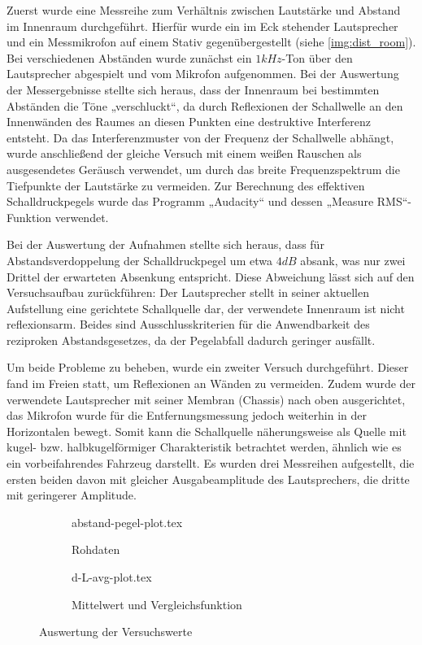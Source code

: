 Zuerst wurde eine Messreihe zum Verhältnis zwischen Lautstärke und Abstand im Innenraum durchgeführt. Hierfür wurde ein im Eck stehender Lautsprecher und ein Messmikrofon auf einem Stativ gegenübergestellt (siehe \autoref{img:dist_room}). Bei verschiedenen Abständen wurde zunächst ein \(1 kHz\)-Ton über den Lautsprecher abgespielt und vom Mikrofon aufgenommen. Bei der Auswertung der Messergebnisse stellte sich heraus, dass der Innenraum bei bestimmten Abständen die Töne „verschluckt“, da durch Reflexionen der Schallwelle an den Innenwänden des Raumes an diesen Punkten eine destruktive Interferenz entsteht. Da das Interferenzmuster von der Frequenz der Schallwelle abhängt, wurde anschließend der gleiche Versuch mit einem weißen Rauschen als ausgesendetes Geräusch verwendet, um durch das breite Frequenzspektrum die Tiefpunkte der Lautstärke zu vermeiden. Zur Berechnung des effektiven Schalldruckpegels wurde das Programm „Audacity“ \cite{Audacity} und dessen „Measure RMS“-Funktion verwendet.

Bei der Auswertung der Aufnahmen stellte sich heraus, dass für Abstandsverdoppelung der Schalldruckpegel um etwa \(4 dB\) absank, was nur zwei Drittel der erwarteten Absenkung entspricht. Diese Abweichung lässt sich auf den Versuchsaufbau zurückführen: Der Lautsprecher stellt in seiner aktuellen Aufstellung eine gerichtete Schallquelle dar, der verwendete Innenraum ist nicht reflexionsarm. Beides sind Ausschlusskriterien für die Anwendbarkeit des reziproken Abstandsgesetzes, da der Pegelabfall dadurch geringer ausfällt.

Um beide Probleme zu beheben, wurde ein zweiter Versuch durchgeführt. Dieser fand im Freien statt, um Reflexionen an Wänden zu vermeiden. Zudem wurde der verwendete Lautsprecher mit seiner Membran (Chassis) nach oben ausgerichtet, das Mikrofon wurde für die Entfernungsmessung jedoch weiterhin in der Horizontalen bewegt. Somit kann die Schallquelle näherungsweise als Quelle mit kugel- bzw. halbkugelförmiger Charakteristik betrachtet werden, ähnlich wie es ein vorbeifahrendes Fahrzeug darstellt. \cite{SengpielDirektUndRaumfeld} Es wurden drei Messreihen aufgestellt, die ersten beiden davon mit gleicher Ausgabeamplitude des Lautsprechers, die dritte mit geringerer Amplitude.

\begin{figure}[h]
    \begin{subfigure}{.5\textwidth}
        \centering
        {abstand-pegel-plot.tex}
        \caption{Rohdaten}
        \label{fig:pegelplot_roh}
    \end{subfigure}
    \hfil
    \begin{subfigure}{.5\textwidth}
        \centering
        {d-L-avg-plot.tex}
        \caption{Mittelwert und Vergleichsfunktion}
        \label{fig:pegelplot_avg}
    \end{subfigure}
    \caption{Auswertung der Versuchswerte}
\end{figure}


